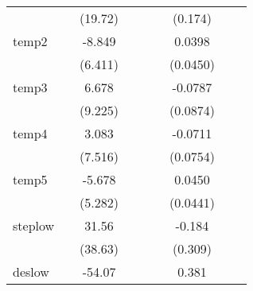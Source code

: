 {\begin{tabular}{l*{8}{c}}
            &                     &     (19.72)         &                     &                     &                     &     (0.174)         &                     &                     \\
[1em]
temp2       &                     &      -8.849         &                     &                     &                     &      0.0398         &                     &                     \\
            &                     &     (6.411)         &                     &                     &                     &    (0.0450)         &                     &                     \\
[1em]
temp3       &                     &       6.678         &                     &                     &                     &     -0.0787         &                     &                     \\
            &                     &     (9.225)         &                     &                     &                     &    (0.0874)         &                     &                     \\
[1em]
temp4       &                     &       3.083         &                     &                     &                     &     -0.0711         &                     &                     \\
            &                     &     (7.516)         &                     &                     &                     &    (0.0754)         &                     &                     \\
[1em]
temp5       &                     &      -5.678         &                     &                     &                     &      0.0450         &                     &                     \\
            &                     &     (5.282)         &                     &                     &                     &    (0.0441)         &                     &                     \\
[1em]
steplow     &                     &       31.56         &                     &                     &                     &      -0.184         &                     &                     \\
            &                     &     (38.63)         &                     &                     &                     &     (0.309)         &                     &                     \\
[1em]
deslow      &                     &      -54.07         &                     &                     &                     &       0.381         &                     &                     \\

\end{tabular}}
